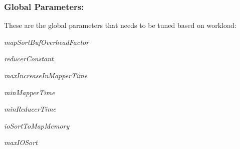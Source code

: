 \subsubsection{\bf Global Parameters:} \label{subsubsec:global_param}
These are the global parameters that needs to be tuned based on workload:
\begin{description}
\item \textit{mapSortBufOverheadFactor}
\item \textit{reducerConstant}
\item \textit{maxIncreaseInMapperTime}
\item \textit{minMapperTime}
\item \textit{minReducerTime}
\item \textit{ioSortToMapMemory}
\item \textit{maxIOSort}
\end{description}

